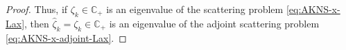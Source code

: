 \begin{proof}
    Thus, if $ \zeta_{k} \in \mathbb{C}_{+}$ is an eigenvalue of the scattering problem \eqref{eq:AKNS-x-Lax}, then $ \hat{\zeta}_{k} = \zeta_{k} \in \mathbb{C}_{+} $ is an eigenvalue of the adjoint scattering problem \eqref{eq:AKNS-x-adjoint-Lax}. %
\end{proof}